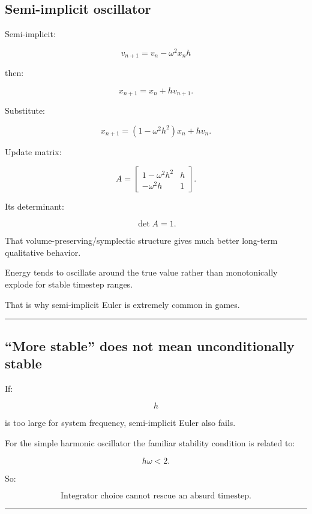 \subsection{Semi-implicit oscillator}\label{06-engine-ii-ch037-semi-implicit-oscillator}

Semi-implicit:

\[
v_{n+1}
=
v_n-\omega^2x_nh
\]

then:

\[
x_{n+1}
=
x_n+h v_{n+1}.
\]

Substitute:

\[
x_{n+1}
=
(1-\omega^2h^2)x_n+
hv_n.
\]

Update matrix:

\[
A=
\begin{bmatrix}
1-\omega^2h^2&h\\
-\omega^2h&1
\end{bmatrix}.
\]

Its determinant:

\[
\det A=1.
\]

That volume-preserving/symplectic structure gives much better long-term qualitative behavior.

Energy tends to oscillate around the true value rather than monotonically explode for stable timestep ranges.

That is why semi-implicit Euler is extremely common in games.

\begin{center}\rule{0.5\linewidth}{0.5pt}\end{center}

\subsection{``More stable'' does not mean unconditionally stable}\label{06-engine-ii-ch037-more-stable-does-not-mean-unconditionally-stable}

If:

\[
h
\]

is too large for system frequency, semi-implicit Euler also fails.

For the simple harmonic oscillator the familiar stability condition is related to:

\[
h\omega<2.
\]

So:

\[
\boxed{
\text{Integrator choice cannot rescue an absurd timestep.}
}
\]

\begin{center}\rule{0.5\linewidth}{0.5pt}\end{center}

